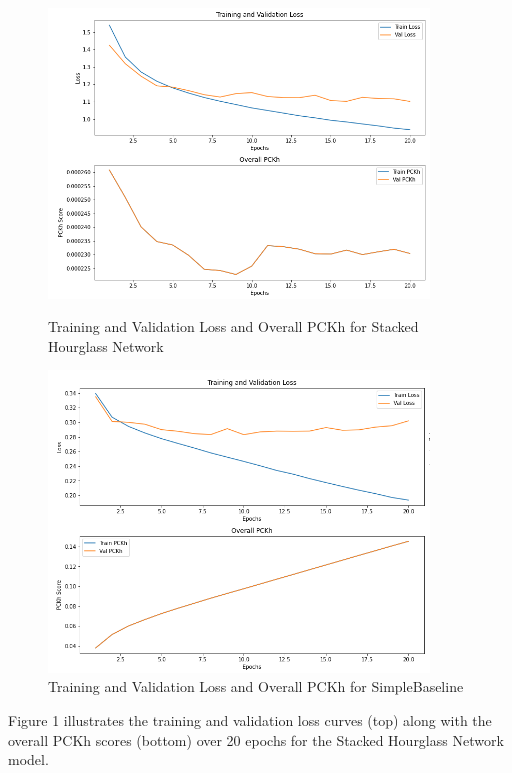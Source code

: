 \documentclass{article}
\begin{document}
\begin{figure}[htbp]
  \centering
  \begin{minipage}{0.48\textwidth}
    \centering
    \includegraphics[width=0.9\textwidth]{figure1.png}
        \caption{Training and Validation Loss and Overall PCKh for Stacked Hourglass Network}
        \label{fig:stacked_hourglass_loss}
  \end{minipage}
  \hfill
  \begin{minipage}{0.48\textwidth}
    \centering
    \includegraphics[width=0.9\textwidth]{figure2.png}
    \caption{Training and Validation Loss and Overall PCKh for SimpleBaseline}
    \label{fig:simplebaseline_loss}
  \end{minipage}
\end{figure}

Figure 1 illustrates the training and validation loss curves (top) along with the overall PCKh scores (bottom) over 20 epochs for the Stacked Hourglass Network model.
\end{document}
